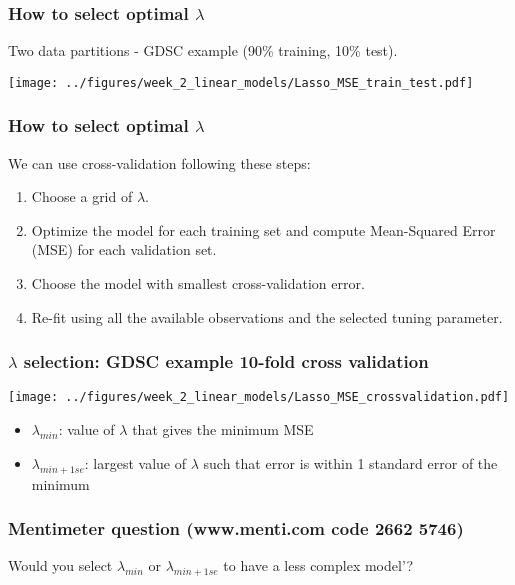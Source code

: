 \documentclass[notes]{beamer}          %
\begin{document}
\begin{frame}
\frametitle{How to select optimal $\lambda$}

Two data partitions - GDSC example (90\% training, 10\% test).

\begin{center}
\texttt{[image: ../figures/week\_2\_linear\_models/Lasso\_MSE\_train\_test.pdf]}
\end{center}
\end{frame}

\begin{frame}
\frametitle{How to select optimal $\lambda$}

We can use cross-validation following these steps:
\begin{enumerate}
  \item Choose a grid of $\lambda$.
  \item Optimize the model for each training set and compute Mean-Squared Error (MSE) for each validation set.
  \item Choose the model with smallest cross-validation error.
  \item Re-fit using all the available observations and the selected tuning parameter.
\end{enumerate}

\end{frame}

\begin{frame}
\frametitle{$\lambda$ selection: GDSC example 10-fold cross validation}

\begin{center}
\texttt{[image: ../figures/week\_2\_linear\_models/Lasso\_MSE\_crossvalidation.pdf]}
\end{center}

\vspace{-2mm} 

\begin{itemize}
    \item $\lambda_{min}$: value of $\lambda$ that gives the minimum MSE
    \item $\lambda_{min+1se}$: largest value of $\lambda$ such that error is within 1 standard error of the minimum
\end{itemize}

\end{frame}

\begin{frame}
\frametitle{Mentimeter question (www.menti.com code 2662 5746)}

Would you select $\lambda_{min}$ or $\lambda_{min+1se}$ to have a less complex model'?

\end{frame}
\end{document}
